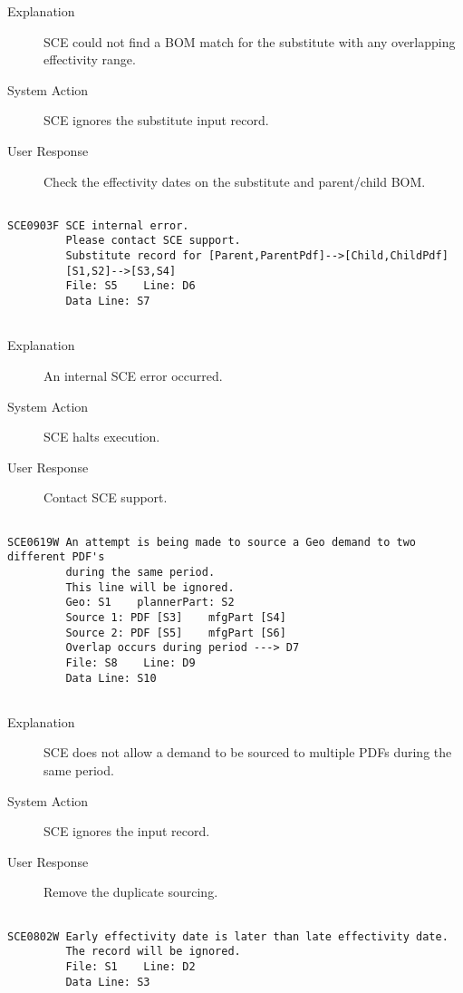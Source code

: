 \begin{description}
\item[Explanation]  SCE could not find a BOM match for the substitute with any overlapping effectivity range.

\item[System Action]  SCE ignores the substitute input record.

\item[User Response]  Check the effectivity dates on the substitute and parent/child BOM.
\end{description}
\hrulefill
\begin{verbatim}

SCE0903F SCE internal error.
         Please contact SCE support.
         Substitute record for [Parent,ParentPdf]-->[Child,ChildPdf]
         [S1,S2]-->[S3,S4]
         File: S5    Line: D6
         Data Line: S7
         
\end{verbatim}
\begin{description}
\item[Explanation]  An internal SCE error occurred.

\item[System Action]  SCE halts execution.

\item[User Response]  Contact SCE support.
\end{description}
\hrulefill
\begin{verbatim}

SCE0619W An attempt is being made to source a Geo demand to two different PDF's
         during the same period.
         This line will be ignored.
         Geo: S1    plannerPart: S2
         Source 1: PDF [S3]    mfgPart [S4]
         Source 2: PDF [S5]    mfgPart [S6]
         Overlap occurs during period ---> D7
         File: S8    Line: D9
         Data Line: S10
         
\end{verbatim}
\begin{description}
\item[Explanation]  SCE does not allow a demand to be sourced to multiple PDFs during the same period.

\item[System Action]  SCE ignores the input record.

\item[User Response]  Remove the duplicate sourcing.
\end{description}
\hrulefill
\begin{verbatim}

SCE0802W Early effectivity date is later than late effectivity date.
         The record will be ignored.
         File: S1    Line: D2
         Data Line: S3
\end{verbatim}

